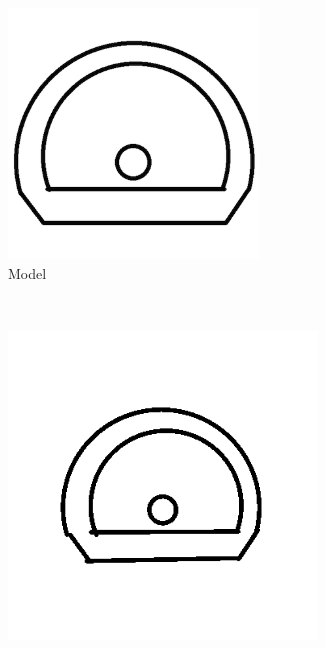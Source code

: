     \begin{figure}[h]
        \centering
                \begin{subfigure}[b]{0.2\textwidth}
                \centering
                \includegraphics[width=0.73\textwidth]{figures/Results/Sketches100/Models.png}
                \caption{Model}
                \end{subfigure}\\
                \begin{subfigure}[b]{0.25\textwidth}
                \centering
                \includegraphics[width=0.9\textwidth]{figures/Results/Sketches100/level1.png}

\end{subfigure}
\end{figure}
